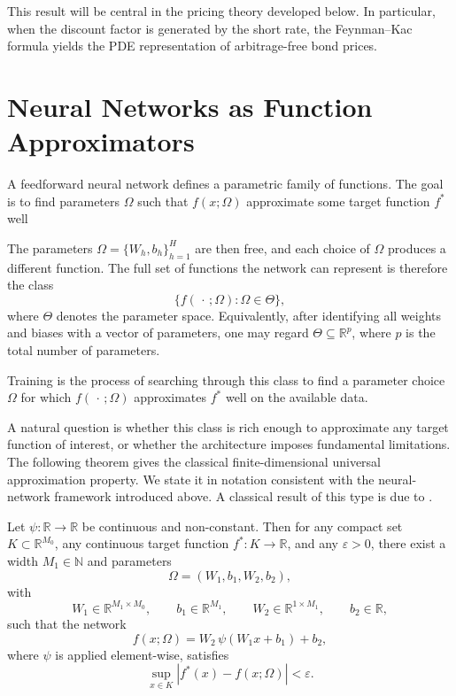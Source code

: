 This result will be central in the pricing theory developed below. In particular, when the discount factor is generated by the short rate, the Feynman--Kac formula yields the PDE representation of arbitrage-free bond prices.







\section{Neural Networks as Function Approximators}

A feedforward neural network defines a parametric family of functions. The goal is to find parameters $\Omega$ such that $f(x;\Omega)$ approximate some target function $f^*$ well 



The parameters $\Omega = \{W_h, b_h\}_{h=1}^H$ are then free, and each choice of $\Omega$ produces a different function. The full set of functions the network can represent is therefore the class
\[
    \bigl\{f(\,\cdot\,;\Omega) : \Omega \in \Theta\bigr\},
\]
where $\Theta$ denotes the parameter space. Equivalently, after identifying all weights and biases with a vector of parameters, one may regard $\Theta \subseteq \mathbb{R}^p$, where $p$ is the total number of parameters.

Training is the process of searching through this class to find a parameter choice $\Omega$ for which $f(\,\cdot\,;\Omega)$ approximates $f^*$ well on the available data. 




A natural question is whether this class is rich enough to approximate any target function of interest, or whether the architecture imposes fundamental limitations. The following theorem gives the classical finite-dimensional universal approximation property. We state it in notation consistent with the neural-network framework introduced above. A classical result of this type is due to \citet{Hornik1989}.

\begin{theorem}
\label{thm:UAT}
Let $\psi : \mathbb{R} \to \mathbb{R}$ be continuous and non-constant. Then for any compact set $K \subset \mathbb{R}^{M_0}$, any continuous target function $f^* : K \to \mathbb{R}$, and any $\varepsilon > 0$, there exist a width $M_1 \in \mathbb{N}$ and parameters
\[
    \Omega = (W_1,b_1,W_2,b_2),
\]
with
\[
    W_1 \in \mathbb{R}^{M_1 \times M_0},
    \qquad
    b_1 \in \mathbb{R}^{M_1},
    \qquad
    W_2 \in \mathbb{R}^{1 \times M_1},
    \qquad
    b_2 \in \mathbb{R},
\]
such that the network
\[
    f(x;\Omega) = W_2\,\psi(W_1x+b_1) + b_2,
\]
where $\psi$ is applied element-wise, satisfies
\[
    \sup_{x \in K} |f^*(x)-f(x;\Omega)| < \varepsilon.
\]
\end{theorem}

